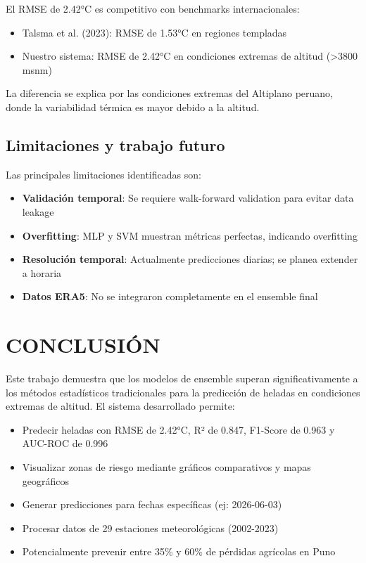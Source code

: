 \documentclass[11pt, a4paper]{article}
\begin{document}
El RMSE de 2.42°C es competitivo con benchmarks internacionales:
\begin{itemize}
    \item Talsma et al. (2023): RMSE de 1.53°C en regiones templadas
    \item Nuestro sistema: RMSE de 2.42°C en condiciones extremas de altitud (>3800 msnm)
\end{itemize}

La diferencia se explica por las condiciones extremas del Altiplano peruano, donde la variabilidad térmica es mayor debido a la altitud.

\subsection{Limitaciones y trabajo futuro}

Las principales limitaciones identificadas son:
\begin{itemize}
    \item \textbf{Validación temporal}: Se requiere walk-forward validation para evitar data leakage
    \item \textbf{Overfitting}: MLP y SVM muestran métricas perfectas, indicando overfitting
    \item \textbf{Resolución temporal}: Actualmente predicciones diarias; se planea extender a horaria
    \item \textbf{Datos ERA5}: No se integraron completamente en el ensemble final
\end{itemize}

\section{CONCLUSIÓN}

Este trabajo demuestra que los modelos de ensemble superan significativamente a los métodos estadísticos tradicionales para la predicción de heladas en condiciones extremas de altitud. El sistema desarrollado permite:

\begin{itemize}
    \item Predecir heladas con RMSE de 2.42°C, R² de 0.847, F1-Score de 0.963 y AUC-ROC de 0.996
    \item Visualizar zonas de riesgo mediante gráficos comparativos y mapas geográficos
    \item Generar predicciones para fechas específicas (ej: 2026-06-03)
    \item Procesar datos de 29 estaciones meteorológicas (2002-2023)
    \item Potencialmente prevenir entre 35\% y 60\% de pérdidas agrícolas en Puno
\end{itemize}
\end{document}
